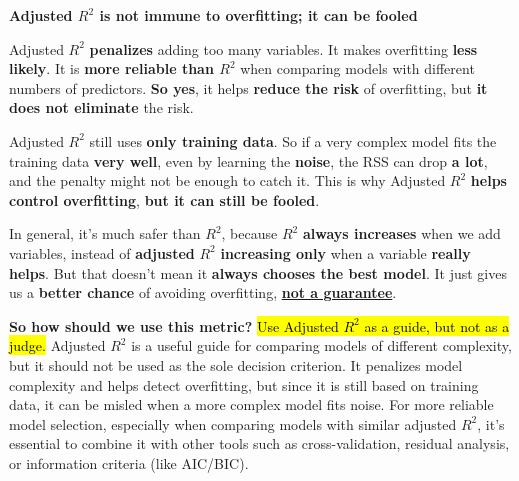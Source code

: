 \highspace
\begin{flushleft}
    \textcolor{Red2}{ \textbf{Adjusted $R^2$ is not immune to overfitting; it can be fooled}}
\end{flushleft}
Adjusted $R^2$ \textbf{penalizes} adding too many variables. It makes overfitting \textbf{less likely}. It is \textbf{more reliable than $R^2$} when comparing models with different numbers of predictors. \textbf{So yes}, it helps \textbf{reduce the risk} of overfitting, but \textbf{it does not eliminate} the risk.

\highspace
Adjusted $R^2$ still uses \textbf{only training data}. So if a very complex model fits the training data \textbf{very well}, even by learning the \textbf{noise}, the RSS can drop \textbf{a lot}, and the penalty might not be enough to catch it. This is why Adjusted $R^2$ \textbf{helps control overfitting}, \textbf{but it can still be fooled}.

\highspace
In general, it's much safer than $R^2$, because $R^2$ \textbf{always increases} when we add variables, instead of \textbf{adjusted} $R^2$ \textbf{increasing only} when a variable \textbf{really helps}. But that doesn't mean it \textbf{always chooses the best model}. It just gives us a \textbf{better chance} of avoiding overfitting, \underline{\textbf{not a guarantee}}.

\highspace
\textcolor{Green3}{ \textbf{So how should we use this metric?}} \hl{Use Adjusted $R^2$ as a guide, but not as a judge.} Adjusted $R^2$ is a useful guide for comparing models of different complexity, but it should not be used as the sole decision criterion. It penalizes model complexity and helps detect overfitting, but since it is still based on training data, it can be misled when a more complex model fits noise. For more reliable model selection, especially when comparing models with similar adjusted $R^2$, it's essential to combine it with other tools such as cross-validation, residual analysis, or information criteria (like AIC/BIC).

